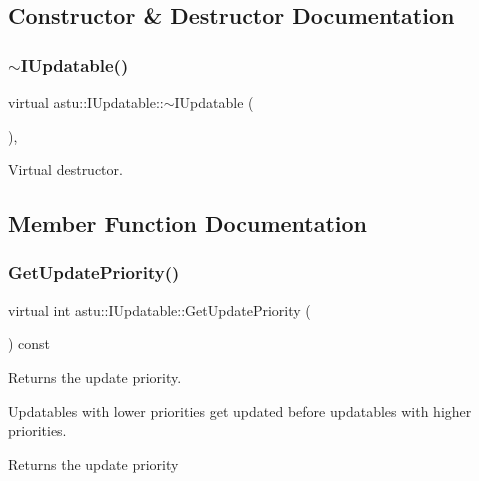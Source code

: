 \subsection{Constructor \& Destructor Documentation}
\mbox{\label{classastu_1_1IUpdatable_ae0ba3ec6b901ef3dd3692471222180e6}} 
\subsubsection{\texorpdfstring{$\sim$\+I\+Updatable()}{~IUpdatable()}}
{\footnotesize\ttfamily virtual astu\+::\+I\+Updatable\+::$\sim$\+I\+Updatable (\begin{DoxyParamCaption}{ }\end{DoxyParamCaption})\hspace{0.3cm}{\ttfamily [inline]}, {\ttfamily [virtual]}}

Virtual destructor. 

\subsection{Member Function Documentation}
\mbox{\label{classastu_1_1IUpdatable_a1bf76b0fce2360b8ade25ef9ae9e3065}} 
\subsubsection{\texorpdfstring{Get\+Update\+Priority()}{GetUpdatePriority()}}
{\footnotesize\ttfamily virtual int astu\+::\+I\+Updatable\+::\+Get\+Update\+Priority (\begin{DoxyParamCaption}{ }\end{DoxyParamCaption}) const\hspace{0.3cm}{\ttfamily [pure virtual]}}

Returns the update priority.

Updatables with lower priorities get updated before updatables with higher priorities.

\begin{DoxyReturn}{Returns}
the update priority 
\end{DoxyReturn}


